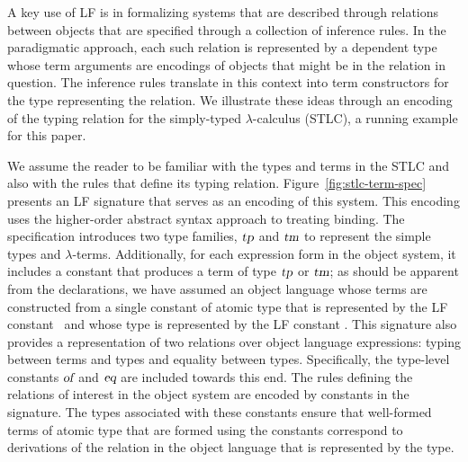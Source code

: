 A key use of LF is in formalizing systems that are described 
through relations between objects that are specified through a
collection of inference rules. 
%
In the paradigmatic approach, each such relation is represented by a
dependent type whose term arguments are encodings of objects that
might be in the relation in question.
%
The inference rules translate in this context into term constructors
for the type representing the relation.
%
We illustrate these ideas through an encoding of the typing relation
for the simply-typed $\lambda$-calculus (STLC), a running example for this
paper. 

We assume the reader to be familiar with the types and terms in the
STLC and also with the rules that define its typing relation.
%
Figure~\ref{fig:stlc-term-spec} presents an LF signature that serves as
an encoding of this system. 
%
This encoding uses the higher-order abstract syntax approach to
treating binding. 
%
The specification introduces two type families, $\mbox{\sl tp}$ and $\mbox{\sl tm}$ to 
represent the simple types and $\lambda$-terms.
%
Additionally, for each expression form in the object system, it
includes a constant that produces a term of type $\mbox{\sl tp}$ or $\mbox{\sl tm}$;
as should be apparent from the declarations, we have assumed an object
language whose terms are constructed from a single constant of
atomic type that is represented by the LF constant \emptytm\ and whose
type is represented by the LF constant \unittm.
%
This signature also provides a representation of two relations over
object language expressions: typing between terms and types and
equality between types. 
%
Specifically, the type-level constants $\mbox{\sl of}$ and $\mbox{\sl eq}$ are
included towards this end. 
%
The rules defining the relations of interest in the object system are
encoded by constants in the signature.
%
The types associated with these constants ensure that well-formed
terms of atomic type that are formed using the constants correspond to
derivations of the relation in the object language that is represented
by the type. 

